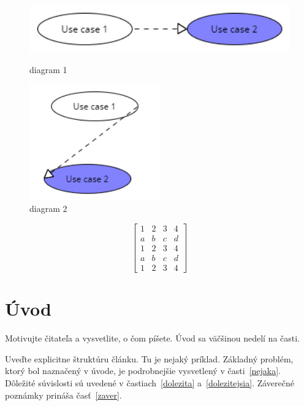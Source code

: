 \documentclass[10pt,twocolumn,slovak,a4paper]{coursepaper}
\begin{document}
\begin{figure}[!tbp]
  \centering
  \begin{minipage}[b]{0.4\textwidth}
 \centering
    \includegraphics[width=1\textwidth]{diagramtest1.png}
    \caption{diagram 1}
  \end{minipage}
  \hfill
  \begin{minipage}[b]{0.4\textwidth}
 \centering
    \includegraphics[width=0.5\textwidth]{diagramtest2.png}
    \caption{diagram 2}
  \end{minipage}
\end{figure}

\[
\begin{bmatrix}
1 & 2 & 3 & 4\\
a & b & c & d\\
1 & 2 & 3 & 4\\
a & b & c & d\\
1 & 2 & 3 & 4
\end{bmatrix}
\]

\section{Úvod}

Motivujte čitateľa a vysvetlite, o čom píšete. Úvod sa väčšinou nedelí na časti.

Uveďte explicitne štruktúru článku. Tu je nejaký príklad.
Základný problém, ktorý bol naznačený v úvode, je podrobnejšie vysvetlený v časti~\ref{nejaka}.
Dôležité súvislosti sú uvedené v častiach~\ref{dolezita} a~\ref{dolezitejsia}.
Záverečné poznámky prináša časť~\ref{zaver}.
\end{document}
